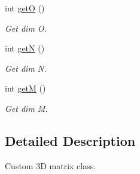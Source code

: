 \begin{DoxyCompactItemize}
int \hyperlink{classMatrix3D_aeae51b36ac95e7776c59d2055eea33b1}{get\-O} ()
\begin{DoxyCompactList}\small\item\em Get dim O. \end{DoxyCompactList}\item 
int \hyperlink{classMatrix3D_aa3c40df02838ee04d18ae40c6c4c5e3f}{get\-N} ()
\begin{DoxyCompactList}\small\item\em Get dim N. \end{DoxyCompactList}\item 
int \hyperlink{classMatrix3D_af0071aecbd9d8af56d2d30c92f9d970e}{get\-M} ()
\begin{DoxyCompactList}\small\item\em Get dim M. \end{DoxyCompactList}\end{DoxyCompactItemize}


\subsection{Detailed Description}
Custom 3\-D matrix class. 

